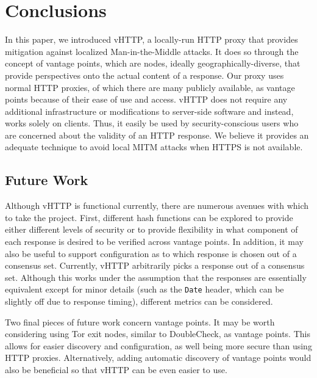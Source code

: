 \section{Conclusions}
\label{sec:conclusion}

In this paper, we introduced vHTTP, a locally-run HTTP proxy that provides
mitigation against localized Man-in-the-Middle attacks. It does so through the
concept of vantage points, which are nodes, ideally geographically-diverse,
that provide perspectives onto the actual content of a response. Our proxy
uses normal HTTP proxies, of which there are many publicly available, as
vantage points because of their ease of use and access. vHTTP does not require
any additional infrastructure or modifications to server-side software and
instead, works solely on clients. Thus, it easily be used by security-conscious
users who are concerned about the validity of an HTTP response. We believe it
provides an adequate technique to avoid local MITM attacks when HTTPS is not
available.

\subsection{Future Work}

Although vHTTP is functional currently, there are numerous avenues with which
to take the project. First, different hash functions can be explored to provide
either different levels of security or to provide flexibility in what component
of each response is desired to be verified across vantage points. In addition,
it may also be useful to support configuration as to which response is chosen
out of a consensus set. Currently, vHTTP arbitrarily picks a response out of a
consensus set. Although this works under the assumption that the responses are
essentially equivalent except for minor details (such as the \texttt{Date}
header, which can be slightly off due to response timing), different metrics
can be considered.

Two final pieces of future work concern vantage points. It may be worth
considering using Tor exit nodes, similar to DoubleCheck, as vantage points.
This allows for easier discovery and configuration, as well being more secure
than using HTTP proxies. Alternatively, adding automatic discovery of vantage
points would also be beneficial so that vHTTP can be even easier to use.
